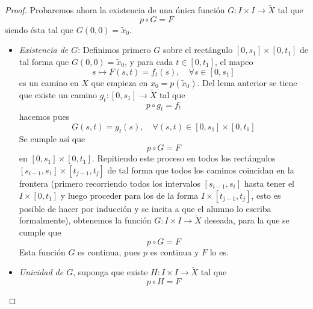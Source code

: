 \documentclass[12pt]{report}
\theoremstyle{largebreak}
\newcommand\cf[3]{\ensuremath{#1:#2\rightarrow#3}}
\begin{document}
\begin{proof}
        Probaremos ahora la existencia de una única función $\cf{G}{I\times I}{\widetilde{X}}$ tal que
        \begin{equation*}
            p\circ G=F
        \end{equation*}
        siendo ésta tal que $G(0,0)=\widetilde{x}_0$.
        \begin{itemize}
            \item \textit{Existencia de $G$}: Definimos primero $G$ sobre el rectángulo $[0,s_1]\times[0,t_1]$ de tal forma que $G(0,0)=\widetilde{x}_0$, y para cada $t\in [0,t_1]$, el mapeo
            \begin{equation*}
                s\mapsto F(s,t)=f_t(s),\quad\forall s\in[0,s_1]
            \end{equation*}
            es un camino en $X$ que empieza en $x_0=p(\widetilde{x}_0)$. Del lema anterior se tiene que existe un camino $\cf{g_t}{[0,s_1]}{\widetilde{X}}$ tal que
            \begin{equation*}
                p\circ g_t=f_t
            \end{equation*}
            hacemos pues
            \begin{equation*}
                G(s,t)=g_t(s),\quad\forall (s,t)\in[0,s_1]\times[0,t_1]
            \end{equation*}
            Se cumple así que
            \begin{equation*}
                p\circ G=F
            \end{equation*}
            en $[0,s_1]\times [0,t_1]$. Repitiendo este proceso en todos los rectángulos $[s_{ i-1},s_1]\times[t_{ j-1},t_j]$ de tal forma que todos los caminos coincidan en la frontera (primero recorriendo todos los intervalos $[s_{ i-1},s_i]$ hasta tener el $I\times[0,t_1]$ y luego proceder para los de la forma $I\times[t_{ j-1},t_j]$, esto es posible de hacer por inducción y se incita a que el alumno lo escriba formalmente), obtenemos la función $\cf{G}{I\times I}{\widetilde{X}}$ deseada, para la que se cumple que
            \begin{equation*}
                p\circ G=F
            \end{equation*}
            Esta función $G$ es continua, pues $p$ es continua y $F$ lo es.
            \item \textit{Unicidad de $G$}, suponga que existe $\cf{H}{I\times I}{\widetilde{X}}$ tal que
            \begin{equation*}
                p\circ H=F
            \end{equation*}

\end{itemize}
\end{proof}
\end{document}
